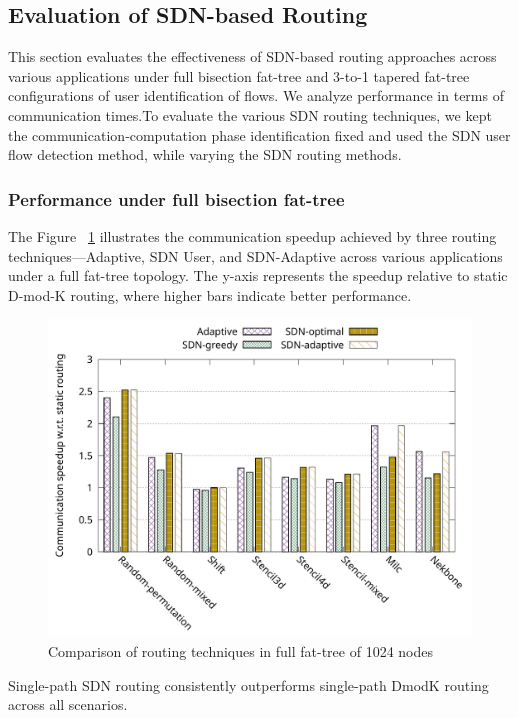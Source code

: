 \subsection{Evaluation of SDN-based Routing}
This section evaluates the effectiveness of SDN-based routing approaches across various applications under full bisection fat-tree and 3-to-1 tapered fat-tree configurations of user identification of flows. We analyze performance in terms of communication times.To evaluate the various SDN routing techniques, we kept the communication‑computation phase identification fixed and used the SDN user flow detection method, while varying the SDN routing methods.

\subsubsection{Performance under full bisection fat-tree}
The Figure ~\ref{fig:routing_full} illustrates the communication speedup achieved by three routing techniques—Adaptive, SDN User, and SDN-Adaptive across various applications under a full fat-tree topology. The y-axis represents the speedup relative to static D-mod-K routing, where higher bars indicate better performance.


\begin{figure}[h]
  \centering
  \includegraphics[width=\columnwidth]{./figs_4/routing_full.pdf}
  \caption{Comparison of routing techniques in full fat-tree of 1024 nodes}
  \label{fig:routing_full}
\end{figure}
Single-path SDN routing consistently outperforms single-path DmodK routing across all scenarios.

